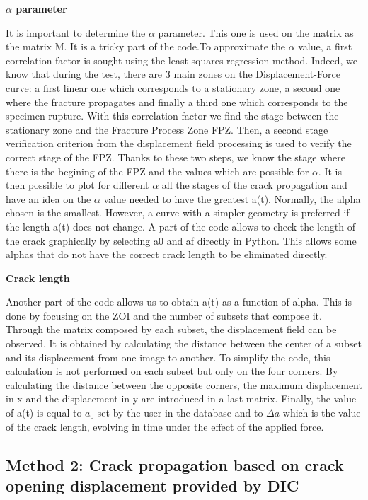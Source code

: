 \textbf{$\alpha$ parameter}

It is important to determine the $\alpha$ parameter. This one is used on the matrix as the matrix M. It is a tricky part of the code.To approximate the $\alpha$ value, a first correlation factor is sought using the least squares regression method. Indeed, we know that during the test, there are 3 main zones on the Displacement-Force curve: a first linear one which corresponds to a stationary zone, a second one where the fracture propagates and finally a third one which corresponds to the specimen rupture. With this correlation factor we find the stage between the stationary zone and the Fracture Process Zone FPZ. Then, a second stage verification criterion from the displacement field processing is used to verify the correct stage of the FPZ.
Thanks to these two steps, we know the stage where there is the begining of the FPZ and the values which are possible for $\alpha$.
It is then possible to plot for different $\alpha$ all the stages of the crack propagation and have an idea on the $\alpha$ value needed to have the greatest a(t). Normally, the alpha chosen is the smallest. However, a curve with a simpler geometry is preferred if the length a(t) does not change.
A part of the code allows to check the length of the crack graphically by selecting a0 and af directly in Python. This allows some alphas that do not have the correct crack length to be eliminated directly.

\textbf{Crack length}

Another part of the code allows us to obtain a(t) as a function of alpha. This is done by focusing on the ZOI and the number of subsets that compose it. Through the matrix composed by each subset, the displacement field can be observed. It is obtained by calculating the distance between the center of a subset and its displacement from one image to another. To simplify the code, this calculation is not performed on each subset but only on the four corners. By calculating the distance between the opposite corners, the maximum displacement in x and the displacement in y are introduced in a last matrix. Finally, the value of a(t) is equal to $a_0$ set by the user in the database and to $\Delta a$ which is the value of the crack length, evolving in time under the effect of the applied force.

\subsection{Method 2: Crack propagation based on crack opening displacement provided by DIC}

